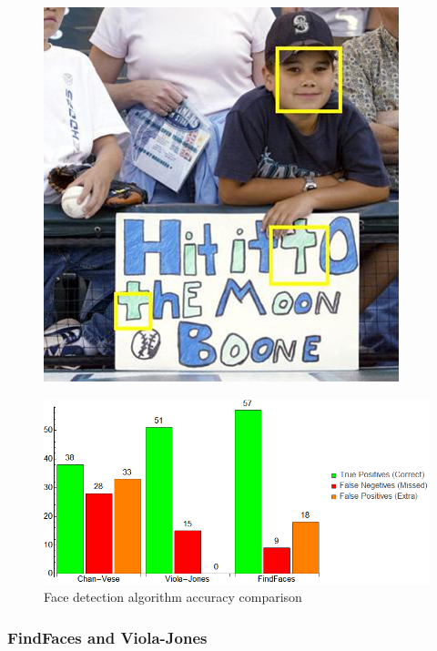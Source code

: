 \begin{figure}[h]
\begin{minipage}{.33\textwidth}
		\centering \includegraphics[width=0.95\linewidth]{illustrations/faces/2/FF}
	\end{minipage}
\end{figure}

\begin{figure}[H]
  \caption{Face detection algorithm accuracy comparison}
  \label{fig:FaceDetectionComparison}
  \centering
    \includegraphics[width=\textwidth]{illustrations/faces/chart}
\end{figure}

\subsubsection{FindFaces and Viola-Jones}

